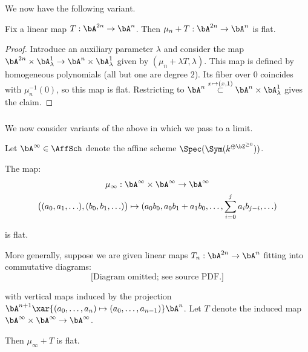 We now have the following variant.

\begin{cor}
\notready\label{c:flat-d}

Fix a linear map $T:\bA^{2n} \to \bA^n$.
Then $\mu_n+T:\bA^{2n} \to \bA^n$ is flat.

\end{cor}

\begin{proof}

Introduce an auxiliary parameter $\lambda$ and
consider the map $\bA^{2n} \times \bA_{\lambda}^1 \to
\bA^n \times \bA_{\lambda}^1$ given by
$(\mu_n+\lambda T,\lambda)$. This map is defined by
homogeneous polynomials (all but one are degree $2$).
Its fiber over $0$ coincides with $\mu_n^{-1}(0)$, so this
map is flat.
Restricting to
$\bA^n \overset{x\mapsto (x,1)}{\subset} \bA^n \times \bA_{\lambda}^1$
gives the claim.

\end{proof}

\subsubsection{}

We now consider variants of the above in which
we pass to a limit.

Let $\bA^{\infty} \in \AffSch$ denote the affine scheme
$\Spec(\Sym(k^{\oplus \bZ^{\geq 0}}))$.

\begin{cor}
\notready\label{c:flat-mult-infty}

The map:
%
\[
\begin{gathered}
\mu_{\infty}:\bA^{\infty} \times \bA^{\infty} \to \bA^{\infty}
\\
\big((a_0,a_1,\ldots),(b_0,b_1,\ldots)\big) \mapsto
(a_0b_0,a_0b_1+a_1b_0,\ldots,\sum_{i = 0}^{j} a_ib_{j-i},\ldots)
\end{gathered}
\]

 is flat.

More generally, suppose we are given linear maps
$T_n:\bA^{2n} \to \bA^n$ fitting into commutative diagrams:
%
\[
\text{[Diagram omitted; see source PDF.]}
\]

 with vertical maps induced by the projection
$\bA^{n+1} \xar{(a_0,\ldots,a_n) \mapsto (a_0,\ldots,a_{n-1})} \bA^n$.
Let $T$ denote the induced map
$\bA^{\infty} \times \bA^{\infty} \to \bA^{\infty}$.

Then $\mu_{\infty}+T$ is flat.

\end{cor}

